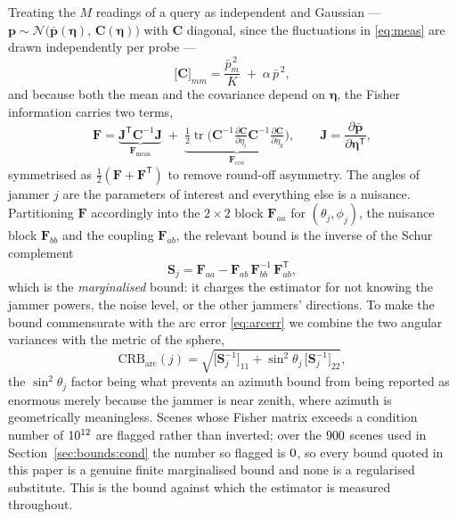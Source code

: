 \documentclass[journal]{IEEEtran}
\newcommand{\pv}{\mathbf{p}}
\newcommand{\CRB}{\mathrm{CRB}}
\newcommand{\tr}{\operatorname{tr}}
\newcommand{\Tr}{\mathsf{T}}
\begin{document}
Treating the $M$ readings of a query as independent and Gaussian ---
$\pv \sim \mathcal{N}\big(\bar{\pv}(\bm{\eta}),\, \mathbf{C}(\bm{\eta})\big)$
with $\mathbf{C}$ diagonal, since the fluctuations in \eqref{eq:meas} are
drawn independently per probe ---
\begin{equation}
\big[\mathbf{C}\big]_{mm}
= \frac{\bar{p}_m^{\,2}}{K} \;+\; \alpha\,\bar{p}^{\,2},
\label{eq:crbvar}
\end{equation}
and because both the mean and the covariance depend on $\bm{\eta}$, the Fisher
information carries two terms,
\begin{equation}
\mathbf{F}
= \underbrace{\mathbf{J}^{\Tr}\mathbf{C}^{-1}\mathbf{J}}_{\textstyle \mathbf{F}_{\mathrm{mean}}}
\;+\;
\underbrace{\tfrac{1}{2}\tr\!\Big(
\mathbf{C}^{-1}\tfrac{\partial \mathbf{C}}{\partial \eta_i}
\mathbf{C}^{-1}\tfrac{\partial \mathbf{C}}{\partial \eta_k}
\Big)}_{\textstyle \mathbf{F}_{\mathrm{cov}}} ,
\qquad
\mathbf{J} = \frac{\partial \bar{\pv}}{\partial \bm{\eta}^{\Tr}} ,
\label{eq:fim}
\end{equation}
symmetrised as $\tfrac{1}{2}(\mathbf{F} + \mathbf{F}^{\Tr})$ to remove
round-off asymmetry. The angles of jammer $j$ are the parameters of interest
and everything else is a nuisance. Partitioning $\mathbf{F}$ accordingly into
the $2\times2$ block $\mathbf{F}_{aa}$ for $(\theta_j,\phi_j)$, the nuisance
block $\mathbf{F}_{bb}$ and the coupling $\mathbf{F}_{ab}$, the relevant bound
is the inverse of the Schur complement
\begin{equation}
\mathbf{S}_j = \mathbf{F}_{aa}
- \mathbf{F}_{ab}\,\mathbf{F}_{bb}^{-1}\,\mathbf{F}_{ab}^{\Tr},
\label{eq:schur}
\end{equation}
which is the \emph{marginalised} bound: it charges the estimator for not
knowing the jammer powers, the noise level, or the other jammers' directions.
To make the bound commensurate with the arc error \eqref{eq:arcerr} we combine
the two angular variances with the metric of the sphere,
\begin{equation}
\CRB_{\mathrm{arc}}(j)
= \sqrt{\big[\mathbf{S}_j^{-1}\big]_{11}
      + \sin^2\!\theta_j\,\big[\mathbf{S}_j^{-1}\big]_{22}} ,
\label{eq:crbarc}
\end{equation}
the $\sin^2\theta_j$ factor being what prevents an azimuth bound from being
reported as enormous merely because the jammer is near zenith, where azimuth
is geometrically meaningless. Scenes whose Fisher matrix exceeds a condition
number of $10^{12}$ are flagged rather than inverted; over the
$900$ scenes used in Section~\ref{sec:bounds:cond} the number so
flagged is $0$, so every bound quoted in this paper is a genuine finite
marginalised bound and none is a regularised substitute. This is the bound
against which the estimator is measured throughout.
\end{document}
